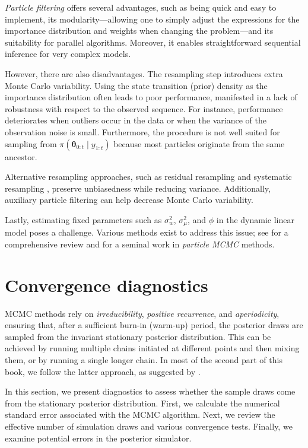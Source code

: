 \textit{Particle filtering} offers several advantages, such as being quick and easy to implement, its modularity—allowing one to simply adjust the expressions for the importance distribution and weights when changing the problem—and its suitability for parallel algorithms. Moreover, it enables straightforward sequential inference for very complex models.

However, there are also disadvantages. The resampling step introduces extra Monte Carlo variability. Using the state transition (prior) density as the importance distribution often leads to poor performance, manifested in a lack of robustness with respect to the observed sequence. For instance, performance deteriorates when outliers occur in the data or when the variance of the observation noise is small. Furthermore, the procedure is not well suited for sampling from $\pi(\bm{\theta}_{0:t}\mid y_{1:t})$ because most particles originate from the same ancestor.

Alternative resampling approaches, such as residual resampling \cite{Liu1995} and systematic resampling \cite{Carpenter1999}, preserve unbiasedness while reducing variance. Additionally, auxiliary particle filtering \cite{Cappe2007} can help decrease Monte Carlo variability.

Lastly, estimating fixed parameters such as $\sigma_w^2$, $\sigma_{\mu}^2$, and $\phi$ in the dynamic linear model poses a challenge. Various methods exist to address this issue; see \cite{Kantas2009,kantas2015particle} for a comprehensive review and \cite{Andrieu2010} for a seminal work in \textit{particle MCMC} methods.

\section{Convergence diagnostics}\label{sec54}
MCMC methods rely on \textit{irreducibility}, \textit{positive recurrence}, and \textit{aperiodicity}, ensuring that, after a sufficient burn-in (warm-up) period, the posterior draws are sampled from the invariant stationary posterior distribution. This can be achieved by running multiple chains initiated at different points and then mixing them, or by running a single longer chain. In most of the second part of this book, we follow the latter approach, as suggested by \cite{geyer1992practical}. 

In this section, we present diagnostics to assess whether the sample draws come from the stationary posterior distribution. First, we calculate the numerical standard error associated with the MCMC algorithm. Next, we review the effective number of simulation draws and various convergence tests. Finally, we examine potential errors in the posterior simulator.

